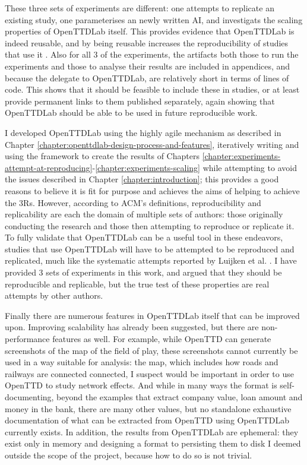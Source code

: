 \documentclass[logo,msc,dsti]{infthesis}    %
\begin{document}
{These three sets of experiments are different: one attempts to replicate an existing study, one parameterises an newly written AI, and investigats the scaling properties of OpenTTDLab itself. This provides evidence that OpenTTDLab is indeed reusable, and by being reusable increases the reproducibility of studies that use it \cite{benureau2018re}. Also for all 3 of the experiments, the artifacts both those to run the experiments and those to analyse their results are included in appendices, and because the delegate to OpenTTDLab, are relatively short in terms of lines of code. This shows that it should be feasible to include these in studies, or at least provide permanent links to them published separately, again showing that OpenTTDLab should be able to be used in future reproducible work.

I developed OpenTTDLab using the highly agile mechanism as described in Chapter \ref{chapter:openttdlab-design-process-and-features}, iteratively writing and using the framework to create the results of Chapters \ref{chapter:experiments-attempt-at-reproducing}-\ref{chapter:experiments-scaling} while attempting to avoid the issues described in Chapter \ref{chapter:introduction}; this provides a good reasons to believe it is fit for purpose and achieves the aims of helping to achieve the 3Rs. However, according to ACM's definitions, reproducibility and replicability are each the domain of multiple sets of authors: those originally conducting the research and those then attempting to reproduce or replicate it. To fully validate that OpenTTDLab can be a useful tool in these endeavors, studies that use OpenTTDLab will have to be attempted to be reproduced and replicated, much like the systematic attempts reported by Luijken et al. \cite{luijken2024replicability}. I have provided 3 sets of experiments in this work, and argued that they should be reproducible and replicable, but the true test of these properties are real attempts by other authors.

Finally there are numerous features in OpenTTDLab itself that can be improved upon. Improving scalability has already been suggested, but there are non-performance features as well. For example, while OpenTTD can generate screenshots of the map of the field of play, these screenshots cannot currently be used in a way suitable for analysis: the map, which includes how roads and railways are connected connected, I suspect would be important in order to use OpenTTD to study network effects. And while in many ways the format is  self-documenting, beyond the examples that extract company value, loan amount and money in the bank, there are many other values, but no standalone exhaustive documentation of what can be extracted from OpenTTD using OpenTTDLab currently exists. In addition, the results from OpenTTDLab are ephemeral: they exist only in memory and designing a format to persisting them to disk I deemed outside the scope of the project, because how to do so is not trivial.

}
\end{document}
